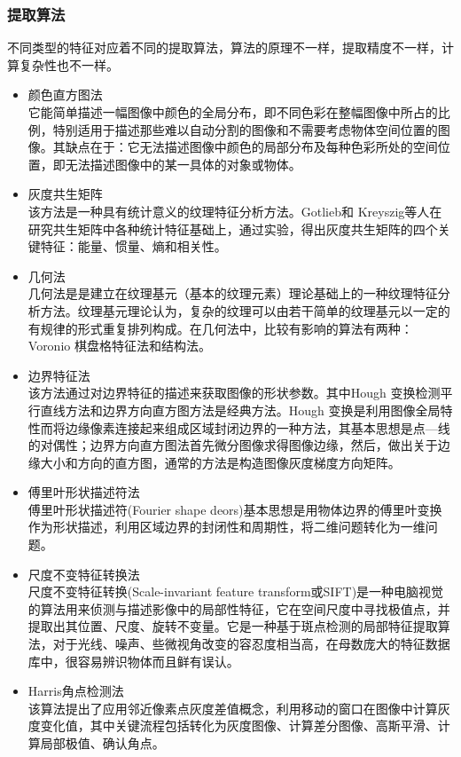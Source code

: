 \subsubsection{提取算法}
不同类型的特征对应着不同的提取算法，算法的原理不一样，提取精度不一样，计算复杂性也不一样。
\begin{itemize}
\item 颜色直方图法\\它能简单描述一幅图像中颜色的全局分布，即不同色彩在整幅图像中所占的比例，特别适用于描述那些难以自动分割的图像和不需要考虑物体空间位置的图像。其缺点在于：它无法描述图像中颜色的局部分布及每种色彩所处的空间位置，即无法描述图像中的某一具体的对象或物体。
\item 灰度共生矩阵\\ 该方法是一种具有统计意义的纹理特征分析方法。Gotlieb和 Kreyszig等人在研究共生矩阵中各种统计特征基础上，通过实验，得出灰度共生矩阵的四个关键特征：能量、惯量、熵和相关性。
\item 几何法\\几何法是是建立在纹理基元（基本的纹理元素）理论基础上的一种纹理特征分析方法。纹理基元理论认为，复杂的纹理可以由若干简单的纹理基元以一定的有规律的形式重复排列构成。在几何法中，比较有影响的算法有两种：Voronio 棋盘格特征法和结构法。
\item 边界特征法\\该方法通过对边界特征的描述来获取图像的形状参数。其中Hough 变换检测平行直线方法和边界方向直方图方法是经典方法。Hough 变换是利用图像全局特性而将边缘像素连接起来组成区域封闭边界的一种方法，其基本思想是点—线的对偶性；边界方向直方图法首先微分图像求得图像边缘，然后，做出关于边缘大小和方向的直方图，通常的方法是构造图像灰度梯度方向矩阵。
\item 傅里叶形状描述符法\\傅里叶形状描述符(Fourier shape deors)基本思想是用物体边界的傅里叶变换作为形状描述，利用区域边界的封闭性和周期性，将二维问题转化为一维问题。
\item 尺度不变特征转换法\\尺度不变特征转换(Scale-invariant feature transform或SIFT)是一种电脑视觉的算法用来侦测与描述影像中的局部性特征，它在空间尺度中寻找极值点，并提取出其位置、尺度、旋转不变量。它是一种基于斑点检测的局部特征提取算法，对于光线、噪声、些微视角改变的容忍度相当高，在母数庞大的特征数据库中，很容易辨识物体而且鲜有误认。
\item Harris角点检测法\\该算法提出了应用邻近像素点灰度差值概念，利用移动的窗口在图像中计算灰度变化值，其中关键流程包括转化为灰度图像、计算差分图像、高斯平滑、计算局部极值、确认角点。
\end{itemize}

